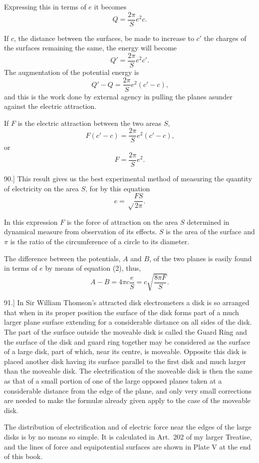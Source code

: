 \documentclass[12pt,oneside]{book}[2021/10/04]
\newcommand{\Runhead}[1]{\fancyhead[C]{\iffloatpage{}{\small#1}}}
\newcommand{\article}[1]{\phantomsection \label{art:#1}{#1.]}}
\newcommand{\¬}{\hphantom{0}}
\begin{document}
Expressing this in terms of \(e\) it becomes
\[
Q = \frac{2 \pi}{S} e^2c\text{.}\tag{4}
\]

If \(c\), the distance between the surfaces, be made to increase to \(c'\)
the charges of the surfaces remaining the same, the energy will
become
\[
Q' = \frac{2 \pi}{S} e^2c'\text{.}\tag{5}
\]
The augmentation of the potential energy is
\[
Q' - Q = \frac{2 \pi}{S} e^2(c' - c)\text{,}\tag{6}
\]
and this is the work done by external agency in pulling the planes
asunder against the electric attraction.

If \(F\) is the electric attraction between the two areas \(S\),
\[
F(c' - c) = \frac{2 \pi}{S} e^2(c' - c)\text{,}\tag{7}
\]
or
\[
F = \frac{2 \pi}{S} e^2\text{.}\tag{8}
\]

\article{90} This result gives us the best experimental method of measuring
the quantity of electricity on the area \(S\), for by this equation
\[
e = \sqrt\frac{FS}{2 \pi}\text{.}\tag{9}
\]

In this expression \(F\) is the force of attraction on the area \(S\) determined
in dynamical measure from observation of its effects. \(S\) is
the area of the surface and \(\pi\) is the ratio of the circumference of a
circle to its diameter.

The difference between the potentials, \(A\) and \(B\), of the two planes
is easily found in terms of \(e\) by means of equation (2), thus,
\[
A - B = 4 \pi c \frac{e}{S} = c \sqrt{\frac{8 \pi F}{S}}\text{.}\tag{10}
\]

\article{91} In Sir William Thomson's attracted disk electrometers a
disk is so arranged that when in its proper position the surface of
the disk forms part of a much larger plane surface extending for a
considerable distance on all sides of the disk. The part of the surface
outside the moveable disk is called the Guard Ring and the
surface of the disk and guard ring together may be considered as
the surface of a large disk, part of which, near its centre, is
moveable. Opposite this disk is placed another disk having its
surface parallel to the first disk and much larger than the moveable
disk. The electrification of the moveable disk is then the
same as that of a small portion of one of the large opposed planes
taken at a considerable distance from the edge of the plane, and
only very small corrections are needed to make the formulæ already
given apply to the case of the moveable disk.
\Runhead{ATTRACTED DISK ELECTROMETERS.}

The distribution of electrification and of electric force near the
edges of the large disks is by no means so simple. It is calculated
in Art.\ 202 of my larger Treatise, and the lines of force and
equipotential surfaces are shown in Plate V at the end of this
book.
\end{document}
